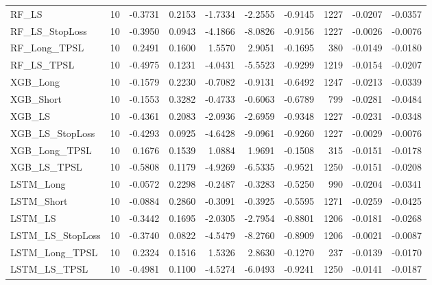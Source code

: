 \begin{tabular}{llrrrrrrrr}
\cline{1-10}
RF\_LS & 10 & -0.3731 & 0.2153 & -1.7334 & -2.2555 & -0.9145 & 1227 & -0.0207 & -0.0357 \\
\cline{1-10}
RF\_LS\_StopLoss & 10 & -0.3950 & 0.0943 & -4.1866 & -8.0826 & -0.9156 & 1227 & -0.0026 & -0.0076 \\
\cline{1-10}
RF\_Long\_TPSL & 10 & 0.2491 & 0.1600 & 1.5570 & 2.9051 & -0.1695 & 380 & -0.0149 & -0.0180 \\
\cline{1-10}
RF\_LS\_TPSL & 10 & -0.4975 & 0.1231 & -4.0431 & -5.5523 & -0.9299 & 1219 & -0.0154 & -0.0207 \\
\cline{1-10}
XGB\_Long & 10 & -0.1579 & 0.2230 & -0.7082 & -0.9131 & -0.6492 & 1247 & -0.0213 & -0.0339 \\
\cline{1-10}
XGB\_Short & 10 & -0.1553 & 0.3282 & -0.4733 & -0.6063 & -0.6789 & 799 & -0.0281 & -0.0484 \\
\cline{1-10}
XGB\_LS & 10 & -0.4361 & 0.2083 & -2.0936 & -2.6959 & -0.9348 & 1227 & -0.0231 & -0.0348 \\
\cline{1-10}
XGB\_LS\_StopLoss & 10 & -0.4293 & 0.0925 & -4.6428 & -9.0961 & -0.9260 & 1227 & -0.0029 & -0.0076 \\
\cline{1-10}
XGB\_Long\_TPSL & 10 & 0.1676 & 0.1539 & 1.0884 & 1.9691 & -0.1508 & 315 & -0.0151 & -0.0178 \\
\cline{1-10}
XGB\_LS\_TPSL & 10 & -0.5808 & 0.1179 & -4.9269 & -6.5335 & -0.9521 & 1250 & -0.0151 & -0.0208 \\
\cline{1-10}
LSTM\_Long & 10 & -0.0572 & 0.2298 & -0.2487 & -0.3283 & -0.5250 & 990 & -0.0204 & -0.0341 \\
\cline{1-10}
LSTM\_Short & 10 & -0.0884 & 0.2860 & -0.3091 & -0.3925 & -0.5595 & 1271 & -0.0259 & -0.0425 \\
\cline{1-10}
LSTM\_LS & 10 & -0.3442 & 0.1695 & -2.0305 & -2.7954 & -0.8801 & 1206 & -0.0181 & -0.0268 \\
\cline{1-10}
LSTM\_LS\_StopLoss & 10 & -0.3740 & 0.0822 & -4.5479 & -8.2760 & -0.8909 & 1206 & -0.0021 & -0.0087 \\
\cline{1-10}
LSTM\_Long\_TPSL & 10 & 0.2324 & 0.1516 & 1.5326 & 2.8630 & -0.1270 & 237 & -0.0139 & -0.0170 \\
\cline{1-10}
LSTM\_LS\_TPSL & 10 & -0.4981 & 0.1100 & -4.5274 & -6.0493 & -0.9241 & 1250 & -0.0141 & -0.0187 \\
\cline{1-10}
\bottomrule
\end{tabular}
